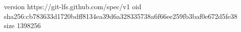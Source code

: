 version https://git-lfs.github.com/spec/v1
oid sha256:cb783633d1720bdff8134ea39d6a328335738a6f66ee259fb3baf0e672d5fe38
size 1398256
